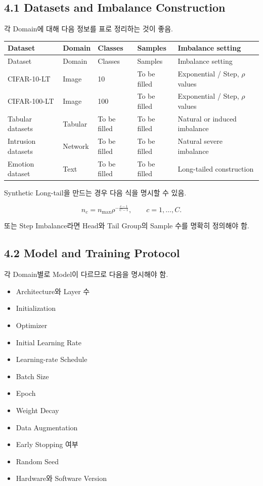 \documentclass[11pt,a4paper]{article}
\begin{document}
\subsection{4.1 Datasets and Imbalance Construction}

각 Domain에 대해 다음 정보를 표로 정리하는 것이 좋음.

\begin{longtable}{p{3.0cm}p{2.4cm}p{2.4cm}p{2.4cm}p{4.0cm}}
\toprule
Dataset & Domain & Classes & Samples & Imbalance setting \\
\midrule
\endfirsthead
\toprule
Dataset & Domain & Classes & Samples & Imbalance setting \\
\midrule
\endhead
CIFAR-10-LT & Image & 10 & To be filled & Exponential / Step, \(\rho\) values \\
CIFAR-100-LT & Image & 100 & To be filled & Exponential / Step, \(\rho\) values \\
Tabular datasets & Tabular & To be filled & To be filled & Natural or induced imbalance \\
Intrusion datasets & Network & To be filled & To be filled & Natural severe imbalance \\
Emotion dataset & Text & To be filled & To be filled & Long-tailed construction \\
\bottomrule
\end{longtable}

Synthetic Long-tail을 만드는 경우 다음 식을 명시할 수 있음.

\[
n_c
=
n_{\max}\rho^{-\frac{c-1}{C-1}},
\qquad c=1,\ldots,C.
\]

또는 Step Imbalance라면 Head와 Tail Group의 Sample 수를 명확히 정의해야 함.

\subsection{4.2 Model and Training Protocol}

각 Domain별로 Model이 다르므로 다음을 명시해야 함.

\begin{itemize}
\item Architecture와 Layer 수
\item Initialization
\item Optimizer
\item Initial Learning Rate
\item Learning-rate Schedule
\item Batch Size
\item Epoch
\item Weight Decay
\item Data Augmentation
\item Early Stopping 여부
\item Random Seed
\item Hardware와 Software Version
\end{itemize}
\end{document}
